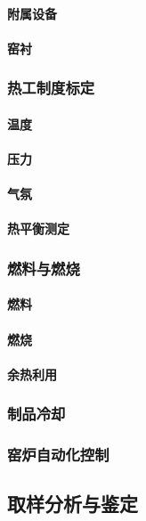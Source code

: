 \documentclass[UTF8]{../../ApplicationUniverse}
\begin{document}
            \paragraph{附属设备}
            \paragraph{窑衬}
        \subsubsection{热工制度标定}
            \paragraph{温度}
            \paragraph{压力}
            \paragraph{气氛}
            \paragraph{热平衡测定}
        \subsubsection{燃料与燃烧}
            \paragraph{燃料}
            \paragraph{燃烧}
            \paragraph{余热利用}
        \subsubsection{制品冷却}
        \subsubsection{窑炉自动化控制}
    \subsection{取样分析与鉴定}
\end{document}
